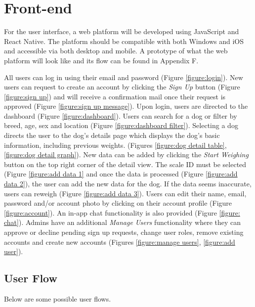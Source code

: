 \section{Front-end}
For the user interface, a web platform will be developed using JavaScript and React Native. The platform should be compatible with both Windows and iOS and accessible via both desktop and mobile. A prototype of what the web platform will look like and its flow can be found in Appendix F.

All users can log in using their email and password (Figure \ref{figure:login}). New users can request to create an account by clicking the \textit{Sign Up} button (Figure \ref{figure:sign up}) and will receive a confirmation mail once their request is approved (Figure \ref{figure:sign up message}). Upon login, users are directed to the dashboard (Figure \ref{figure:dashboard}). Users can search for a dog or filter by breed, age, sex and location (Figure \ref{figure:dashboard filter}). Selecting a dog directs the user to the dog's details page which displays the dog's basic information, including previous weights. (Figures \ref{figure:dog detail table}, \ref{figure:dog detail graph}). New data can be added by clicking the \textit{Start Weighing} button on the top right corner of the detail view. The scale ID must be selected (Figure \ref{figure:add data 1} and once the data is processed (Figure \ref{figure:add data 2}), the user can add the new data for the dog. If the data seems inaccurate, users can reweigh (Figure \ref{figure:add data 3}). Users can edit their name, email, password and/or account photo by clicking on their account profile (Figure \ref{figure:account}). An in-app chat functionality is also provided (Figure \ref{figure: chat}). Admins have an additional \textit{Manage Users} functionality where they can approve or decline pending sign up requests, change user roles, remove existing accounts and create new accounts (Figures \ref{figure:manage users}, \ref{figure:add user}).

\subsection{User Flow}
Below are some possible user flows.


